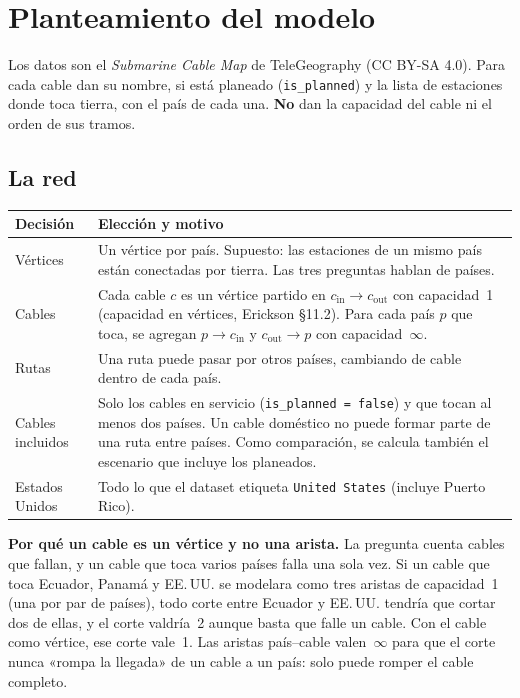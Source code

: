 \documentclass[11pt,a4paper]{article}
\newcommand{\cin}[1]{#1_{\mathrm{in}}}
\newcommand{\cout}[1]{#1_{\mathrm{out}}}
\begin{document}
\newpage
\section*{Planteamiento del modelo}
Los datos son el \emph{Submarine Cable Map} de TeleGeography (CC BY-SA 4.0). Para cada cable dan su nombre, si está planeado (\texttt{is\_planned}) y la lista de estaciones donde toca tierra, con el país de cada una. \textbf{No} dan la capacidad del cable ni el orden de sus tramos.

\subsection*{La red}
\begin{tabularx}{\textwidth}{@{}l X@{}}
\toprule
Decisión & Elección y motivo\\
\midrule
Vértices & Un vértice por país. Supuesto: las estaciones de un mismo país están conectadas por tierra. Las tres preguntas hablan de países.\\
Cables & Cada cable $c$ es un vértice partido en $\cin{c}\to\cout{c}$ con capacidad~1 (capacidad en vértices, Erickson §11.2). Para cada país $p$ que toca, se agregan $p\to\cin{c}$ y $\cout{c}\to p$ con capacidad~$\infty$.\\
Rutas & Una ruta puede pasar por otros países, cambiando de cable dentro de cada país.\\
Cables incluidos & Solo los cables en servicio (\texttt{is\_planned = false}) y que tocan al menos dos países. Un cable doméstico no puede formar parte de una ruta entre países. Como comparación, se calcula también el escenario que incluye los planeados.\\
Estados Unidos & Todo lo que el dataset etiqueta \texttt{United States} (incluye Puerto Rico).\\
\bottomrule
\end{tabularx}

\textbf{Por qué un cable es un vértice y no una arista.} La pregunta cuenta cables que fallan, y un cable que toca varios países falla una sola vez. Si un cable que toca Ecuador, Panamá y EE.\,UU. se modelara como tres aristas de capacidad~1 (una por par de países), todo corte entre Ecuador y EE.\,UU. tendría que cortar dos de ellas, y el corte valdría~2 aunque basta que falle un cable. Con el cable como vértice, ese corte vale~1. Las aristas país--cable valen~$\infty$ para que el corte nunca «rompa la llegada» de un cable a un país: solo puede romper el cable completo.
\end{document}
